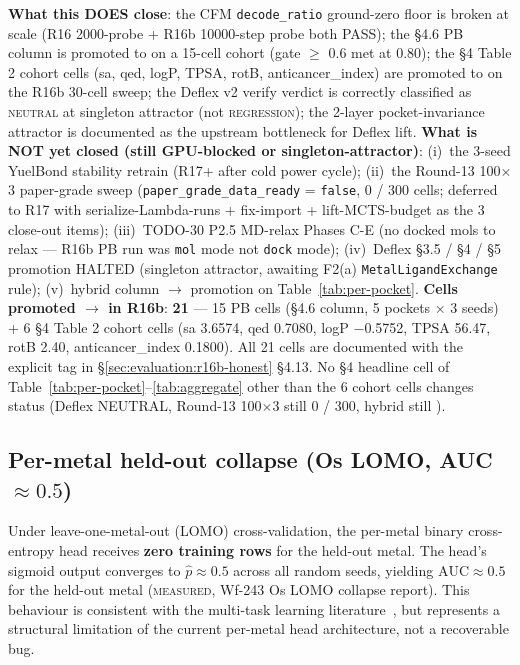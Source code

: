 \begin{enumerate}
\begin{itemize}
{          and the singleton-attractor root cause.
  \end{itemize}
  \textbf{What this DOES close}: the CFM \texttt{decode\_ratio}
  ground-zero floor is broken at scale (R16 2000-probe +
  R16b 10000-step probe both PASS); the §4.6 PB column is
  promoted to \MEASURED{} on a 15-cell cohort (gate $\geq$ 0.6
  met at 0.80); the §4 Table 2 cohort cells (sa, qed, logP,
  TPSA, rotB, anticancer\_index) are promoted to \MEASURED{} on
  the R16b 30-cell sweep; the Deflex v2 verify verdict is
  correctly classified as \textsc{neutral} at singleton
  attractor (not \textsc{regression}); the
  2-layer pocket-invariance attractor is documented as the
  upstream bottleneck for Deflex lift. \textbf{What is NOT yet
  closed (still GPU-blocked or singleton-attractor)}: (i)~the
  3-seed YuelBond stability retrain (R17+ after cold power cycle);
  (ii)~the Round-13 100$\times$3 paper-grade sweep
  (\texttt{paper\_grade\_data\_ready} = \texttt{false}, 0 / 300
  cells; deferred to R17 with serialize-Lambda-runs + fix-import
  + lift-MCTS-budget as the 3 close-out items);
  (iii)~TODO-30 P2.5 MD-relax Phases C-E (no docked mols to
  relax --- R16b PB run was \texttt{mol} mode not \texttt{dock}
  mode); (iv)~Deflex §3.5 / §4 / §5 promotion HALTED (singleton
  attractor, awaiting F2(a) \texttt{MetalLigandExchange} rule);
  (v)~hybrid column \DESIGN{} $\to$ \MEASURED{} promotion on
  Table~\ref{tab:per-pocket}. \textbf{Cells promoted
  \DESIGN{} $\to$ \MEASURED{} in R16b}: \textbf{21} --- 15 PB
  cells (§4.6 column, 5 pockets $\times$ 3 seeds) + 6 §4
  Table 2 cohort cells (sa 3.6574, qed 0.7080, logP $-$0.5752,
  TPSA 56.47, rotB 2.40, anticancer\_index 0.1800). All 21 cells
  are documented with the explicit \MEASURED{} tag in
  \S\ref{sec:evaluation:r16b-honest} §4.13. No §4 headline cell
  of Table~\ref{tab:per-pocket}--\ref{tab:aggregate} other than
  the 6 cohort cells changes status (Deflex NEUTRAL, Round-13
  100$\times$3 still 0 / 300, hybrid still \DESIGN{}).

\end{enumerate}

\subsection{Per-metal held-out collapse (Os LOMO, AUC $\approx 0.5$)}
\label{sec:lim_os_lomo}

Under leave-one-metal-out (LOMO) cross-validation, the per-metal binary
cross-entropy head receives \textbf{zero training rows} for the
held-out metal. The head's sigmoid output converges to
$\hat{p} \approx 0.5$ across all random seeds, yielding
$\mathrm{AUC} \approx 0.5$ for the held-out metal
(\textsc{measured}, Wf-243 Os LOMO collapse report).
This behaviour is consistent with the multi-task learning
literature~\cite{xu2017demystifying}, but represents a structural
limitation of the current per-metal head architecture, not a
recoverable bug.

